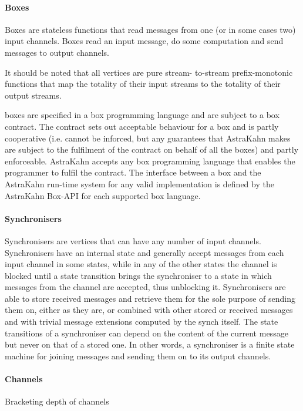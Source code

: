 \paragraph{Boxes}
Boxes are stateless functions that read messages from one (or in some cases two) input channels. Boxes read an input message, do some computation and send messages to output channels.

It should be noted that all vertices are pure stream- to-stream prefix-monotonic functions that map the totality of their input streams to the totality of their output streams.

boxes are specified in a
box programming language and are subject to a box contract. The contract sets out acceptable behaviour for a box and is partly cooperative (i.e. cannot be inforced, but any guarantees that AstraKahn makes are subject to the fulfilment of the contract on behalf of all the boxes) and partly enforceable. AstraKahn accepts any box programming language that enables the programmer to fulfil the contract. The interface between a box and the AstraKahn run-time system for any valid implementation is defined by the AstraKahn Box-API for each supported box language.



\paragraph{Synchronisers}
Synchronisers are vertices that can have any number of input channels. Synchronisers have an internal state and generally accept messages from each input channel in some states, while in any of the other states the channel is blocked until a state transition brings the synchroniser to a state in which messages from the channel are accepted, thus unblocking it. Synchronisers are able to store received messages and retrieve them for the sole purpose of sending them on, either as they are, or combined with other stored or received messages and with trivial message extensions computed by the synch itself. The state transitions of a synchroniser can depend on the content of the current message but never on that of a stored one. In other words, a synchroniser is a finite state machine for joining messages and sending them on to its output channels.


\paragraph{Channels}
Bracketing depth of channels

